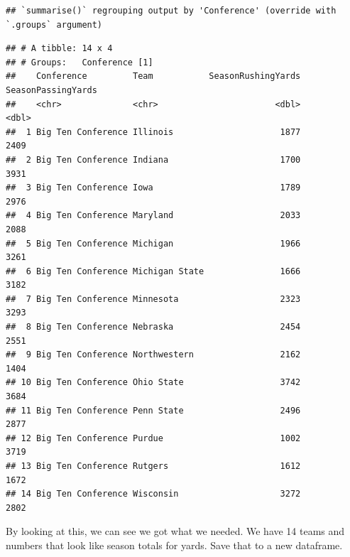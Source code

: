 \documentclass[
]{book}
\newenvironment{Shaded}{\begin{snugshade}}{\end{snugshade}}
\newcommand{\DataTypeTok}[1]{\textcolor[rgb]{0.13,0.29,0.53}{#1}}
\newcommand{\KeywordTok}[1]{\textcolor[rgb]{0.13,0.29,0.53}{\textbf{#1}}}
\newcommand{\NormalTok}[1]{#1}
\newcommand{\OperatorTok}[1]{\textcolor[rgb]{0.81,0.36,0.00}{\textbf{#1}}}
\newcommand{\StringTok}[1]{\textcolor[rgb]{0.31,0.60,0.02}{#1}}
\begin{document}
\begin{verbatim}
## `summarise()` regrouping output by 'Conference' (override with `.groups` argument)
\end{verbatim}

\begin{verbatim}
## # A tibble: 14 x 4
## # Groups:   Conference [1]
##    Conference         Team           SeasonRushingYards SeasonPassingYards
##    <chr>              <chr>                       <dbl>              <dbl>
##  1 Big Ten Conference Illinois                     1877               2409
##  2 Big Ten Conference Indiana                      1700               3931
##  3 Big Ten Conference Iowa                         1789               2976
##  4 Big Ten Conference Maryland                     2033               2088
##  5 Big Ten Conference Michigan                     1966               3261
##  6 Big Ten Conference Michigan State               1666               3182
##  7 Big Ten Conference Minnesota                    2323               3293
##  8 Big Ten Conference Nebraska                     2454               2551
##  9 Big Ten Conference Northwestern                 2162               1404
## 10 Big Ten Conference Ohio State                   3742               3684
## 11 Big Ten Conference Penn State                   2496               2877
## 12 Big Ten Conference Purdue                       1002               3719
## 13 Big Ten Conference Rutgers                      1612               1672
## 14 Big Ten Conference Wisconsin                    3272               2802
\end{verbatim}

By looking at this, we can see we got what we needed. We have 14 teams and numbers that look like season totals for yards. Save that to a new dataframe.

\begin{Shaded}
\end{Shaded}
\end{document}
